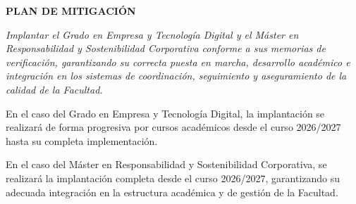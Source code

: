 \documentclass[11pt,a4paper]{scrreprt}
\begin{document}
\begin{tcolorbox}[mitbox]
{\footnotesize\sffamily\bfseries\color{green!40!black} PLAN DE MITIGACI\'ON}\par{}
\end{tcolorbox}
\vspace{8pt}

\newpage
{}
{\small\color{mutedcolor}\itshape Implantar el Grado en Empresa y Tecnología Digital y el Máster en Responsabilidad y Sostenibilidad Corporativa conforme a sus memorias de verificación, garantizando su correcta puesta en marcha, desarrollo académico e integración en los sistemas de coordinación, seguimiento y aseguramiento de la calidad de la Facultad. 

En el caso del Grado en Empresa y Tecnología Digital, la implantación se realizará de forma progresiva por cursos académicos desde el curso 2026/2027 hasta su completa implementación. 

En el caso del Máster en Responsabilidad y Sostenibilidad Corporativa, se realizará la implantación completa desde el curso 2026/2027, garantizando su adecuada integración en la estructura académica y de gestión de la Facultad. }\par\vspace{6pt}
\end{document}

